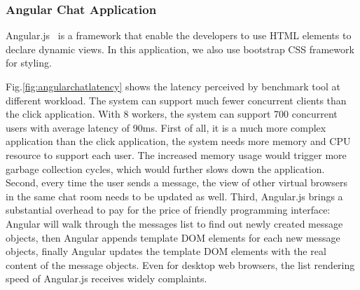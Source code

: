 







\subsubsection{Angular Chat Application}
\label{sec:angular}
Angular.js~\cite{angular} is a \js{} framework that enable the developers to 
use HTML elements to declare dynamic views.
In this application, we also use bootstrap CSS framework for styling.

Fig.\ref{fig:angularchatlatency} shows the latency perceived by benchmark tool
at different workload.
The system can support much fewer concurrent clients than the click application.
With 8 workers, the system can support 700 concurrent users with average latency 
of 90ms.
First of all, it is a much more complex application than the click application,
the system needs more memory and CPU resource to support each user.
The increased memory usage would trigger more garbage collection cycles,
which would further slows down the application.
Second, every time the user sends a message, the view of other virtual browsers
in the same chat room needs to be updated as well.
Third, Angular.js brings a substantial overhead 
to pay for the price of friendly programming interface: %
Angular will walk through the messages list to find out newly created
message objects,
then Angular appends template DOM elements for each new message objects,
finally Angular updates the template DOM elements with the real content of the 
message objects.
Even for desktop web browsers, the list rendering speed of Angular.js
receives widely complaints.%

